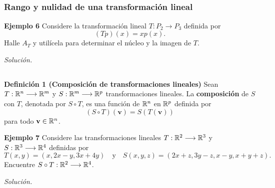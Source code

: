 
\subsection{}

\begin{frame}\frametitle{Rango y nulidad de una transformación lineal}
	
	\begin{ej}{\textbf{Ejemplo 6}}
		\justifying
		Considere la transformación lineal $T: P_2\longrightarrow P_3$ definida por 
		\[
			(Tp)(x)= xp(x).
		\]
		Halle $A_T$ y utilícela para determinar el núcleo y la imagen de $T$.
	\end{ej}
	\textit{Solución.}
	
\end{frame}


\subsection{}

\begin{frame}%

	\begin{block}{\textbf{Definición 1 (Composición de transformaciones lineales)}}
		\justifying
		Sean $T:\mathbb{R}^n\longrightarrow\mathbb{R}^m$ y $S:\mathbb{R}^m\longrightarrow\mathbb{R}^p$ transformaciones lineales. La \textbf{composición} de $S$ con $T$, denotada por $S\circ T$, es una función de $\mathbb{R}^n$ en $\mathbb{R}^p$ definida por 
		\[
		(S\circ T)(\mathbf{v})=S(T(\mathbf{v}))
		\]
		para todo $\mathbf{v}\in \mathbb{R}^n$.
	\end{block}	

	\begin{ej}{\textbf{Ejemplo 7}}
		\justifying
		Considere las transformaciones lineales $T:\mathbb{R}^2\longrightarrow\mathbb{R}^3$ y $S:\mathbb{R}^3\longrightarrow\mathbb{R}^4$ definidas por
		\[
			T(x,y) = (x,2x-y,3x+4y) \quad \text{y} \quad S(x,y,z) = (2x+z,3y-z,x-y,x+y+z).
		\]		
		Encuentre $S\circ T:\mathbb{R}^2\longrightarrow\mathbb{R}^4$.
	\end{ej}
	\textit{Solución.}
	
\end{frame}


